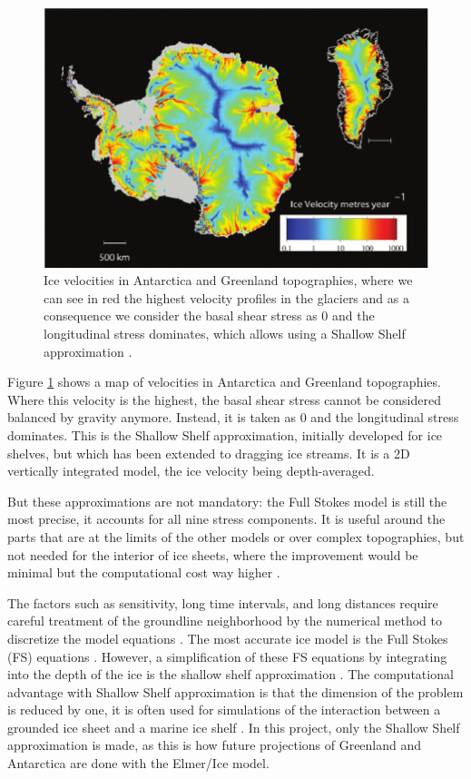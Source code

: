 \documentclass{article}
\begin{document}
\begin{figure}[!h]
	\centering
	\includegraphics[width=0.7\linewidth]{../fig/velocityglaciar.png}
	\caption{Ice velocities in Antarctica and Greenland topographies, where we can see in red the highest velocity profiles in the glaciers and as a consequence we consider the basal shear stress as 0 and the longitudinal stress dominates, which allows using a Shallow Shelf approximation \cite[]{allison2009ice}.}
	\label{velocityglaciar}
\end{figure}
Figure \ref{velocityglaciar} shows a map of velocities in Antarctica and Greenland topographies. Where this velocity is the highest, the basal shear stress cannot be considered balanced by gravity anymore. Instead, it is taken as 0 and the longitudinal stress dominates. This is the Shallow Shelf approximation, initially developed for ice shelves, but which has been extended to dragging ice streams. It is a 2D vertically integrated model, the ice velocity being depth-averaged.

But these approximations are not mandatory: the Full Stokes model is still the most precise, it accounts for all nine stress components. It is useful around the parts that are at the limits of the other models or over complex topographies, but not needed for the interior of ice sheets, where the improvement would be minimal but the computational cost way higher \cite{larour2012continental}.

The factors such as sensitivity, long time intervals, and long distances require careful treatment of the groundline neighborhood by the numerical method to discretize the model equations \cite{cheng2019full}. The most accurate ice model is the Full Stokes (FS) equations \cite{cheng2019full}. However, a simplification of these FS equations by integrating into the depth of the ice is the shallow shelf approximation \cite{macayeal1989large}. The computational advantage with Shallow Shelf approximation is that the dimension of the problem is reduced by one, it is often used for simulations of the interaction between a grounded ice sheet and a marine ice shelf \cite{cheng2019full}. 
In this project, only the Shallow Shelf approximation is made, as this is how future projections of Greenland and Antarctica are done with the Elmer/Ice model.
\end{document}
